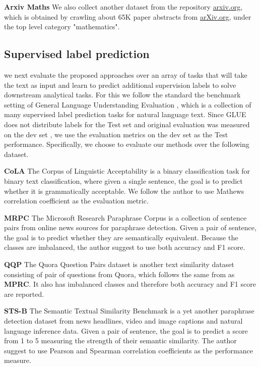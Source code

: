 \noindent \textbf{Arxiv Maths} We also collect another dataset from the repository \url{arxiv.org}, which is obtained by crawling about 65K paper abstracts from \url{arXiv.org}, under the top level category "mathematics". 


\subsection{Supervised label prediction}
we next evaluate the proposed approaches over an array of tasks that will take the text as input and learn to predict additional supervision labels to solve downstream analytical tasks. 
For this we follow the standard the benchmark setting of 
General Language Understanding Evaluation \cite{wang2018glue}, which is a collection of many supervised label prediction tasks for natural language text.
Since GLUE does not distribute labels for the Test set and original evaluation was measured on the dev set \cite{devlin2018bert}, we use the evaluation metrics on the dev set as the Test performance. 
Specifically, we choose to evaluate our methods over the following dataset.

\noindent \textbf{CoLA} The Corpus of Linguistic Acceptability is a binary classification task for binary text classification,
where given a single sentence, the goal is to predict whether it is grammatically acceptable. We follow the author \cite{wang2018glue} to use Mathews correlation coefficient as the evaluation metric.

\noindent \textbf{MRPC} The Microsoft Research Paraphrase Corpus is a collection of sentence pairs from online news sources for paraphrase detection. Given a pair of sentence, the goal is to predict whether they are semantically equivalent. 
Because the classes are imbalanced, the author \cite{wang2018glue} suggest to use both accuracy and F1 score.


\noindent \textbf{QQP} The Quora Question Pairs dataset is another text similarity  dataset consisting of pair of questions from Quora, which follows the same from as \textbf{MPRC}. It also has imbalanced classes and therefore both accuracy and F1 score are reported.


\noindent \textbf{STS-B} 
The Semantic Textual Similarity Benchmark is a yet another paraphrase detection dataset from news headlines,  video and image captions and natural language inference data. Given a pair of sentence, the goal is to predict a score from 1 to 5 measuring the strength of their semantic similarity. The author \cite{wang2018glue} suggest to use Pearson and Spearman correlation coefficients as the performance measure.


